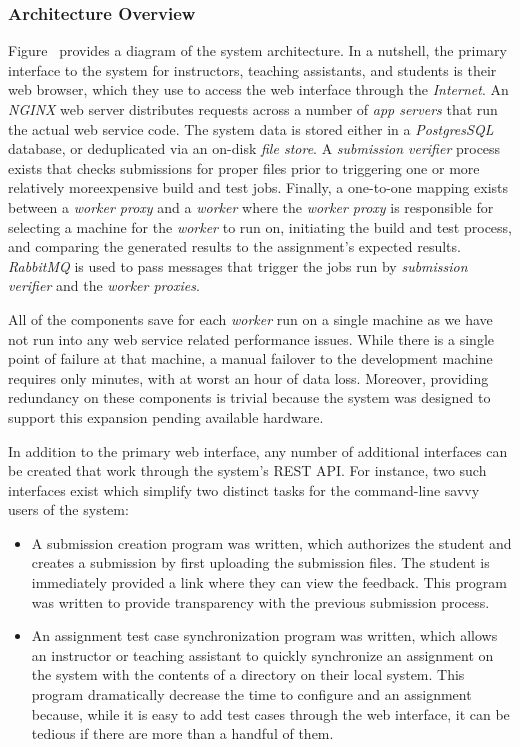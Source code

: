 \subsubsection{Architecture Overview}
Figure~ provides a diagram of the system
architecture. In a nutshell, the primary interface to the system for
instructors, teaching assistants, and students is their web browser, which they
use to access the web interface through the \emph{Internet}. An \emph{NGINX}
web server distributes requests across a number of \emph{app servers} that run
the actual web service code. The system data is stored either in a
\emph{PostgresSQL} database, or deduplicated via an on-disk \emph{file
  store}. A \emph{submission verifier} process exists that checks submissions
for proper files prior to triggering one or more relatively moreexpensive build
and test jobs. Finally, a one-to-one mapping exists between a \emph{worker
  proxy} and a \emph{worker} where the \emph{worker proxy} is responsible for
selecting a machine for the \emph{worker} to run on, initiating the build and
test process, and comparing the generated results to the assignment's expected
results. \emph{RabbitMQ} is used to pass messages that trigger the jobs run by
\emph{submission verifier} and the \emph{worker proxies}.

All of the components save for each \emph{worker} run on a single machine as we
have not run into any web service related performance issues. While there is a
single point of failure at that machine, a manual failover to the development
machine requires only minutes, with at worst an hour of data loss. Moreover,
providing redundancy on these components is trivial because the system was
designed to support this expansion pending available hardware.

In addition to the primary web interface, any number of additional interfaces
can be created that work through the system's REST API. For instance, two such
interfaces exist which simplify two distinct tasks for the command-line savvy
users of the system:

\begin{itemize}
\item A submission creation program was written, which authorizes the student
  and creates a submission by first uploading the submission files. The student
  is immediately provided a link where they can view the feedback. This program
  was written to provide transparency with the previous submission process.
\item An assignment test case synchronization program was written, which allows
  an instructor or teaching assistant to quickly synchronize an assignment on
  the system with the contents of a directory on their local system. This
  program dramatically decrease the time to configure and an assignment
  because, while it is easy to add test cases through the web interface, it can
  be tedious if there are more than a handful of them.
\end{itemize}
